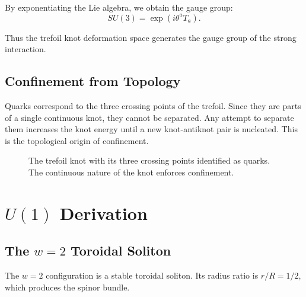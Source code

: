 \documentclass[12pt,oneside]{book}
\begin{document}
By exponentiating the Lie algebra, we obtain the gauge group:
\[
SU(3) = \exp\left( i \theta^a T_a \right).
\]

Thus the trefoil knot deformation space generates the gauge group of the strong interaction.

\section{Confinement from Topology}

Quarks correspond to the three crossing points of the trefoil. Since they are parts of a single continuous knot, they cannot be separated. Any attempt to separate them increases the knot energy until a new knot-antiknot pair is nucleated. This is the topological origin of confinement.

\begin{figure}[H]
\centering
{}
\caption{The trefoil knot with its three crossing points identified as quarks. The continuous nature of the knot enforces confinement.}
\label{fig:su3_confinement}
\end{figure}

\chapter{$U(1)$ Derivation}

\section{The $w=2$ Toroidal Soliton}

The $w=2$ configuration is a stable toroidal soliton. Its radius ratio is $r/R = 1/2$, which produces the spinor bundle.
\end{document}
